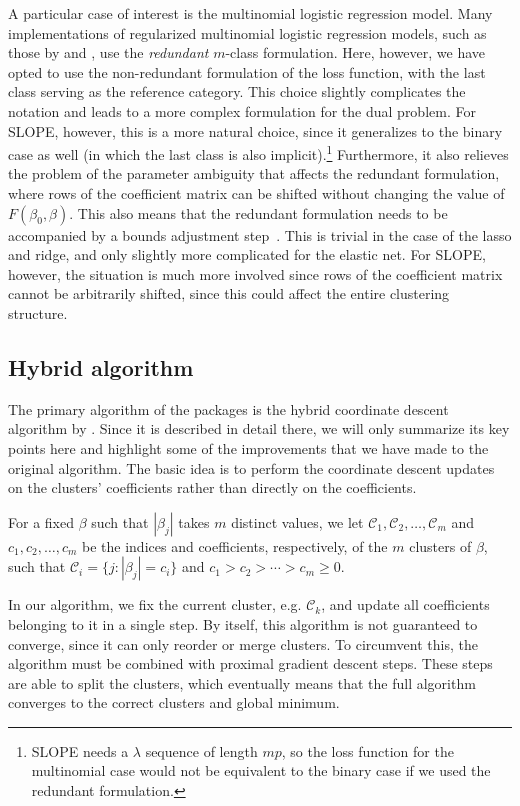 \documentclass[article]{jss}
\begin{document}
A particular case of interest is the multinomial logistic regression model.
Many implementations of regularized multinomial logistic regression models,
such as those by \citet{friedman2010} and \citet{fercoq2015}, use the
\emph{redundant} \(m\)-class formulation. Here, however, we have opted to use
the non-redundant formulation of the loss function, with the last class serving
as the reference category. This choice slightly complicates the notation and
leads to a more complex formulation for the dual problem. For SLOPE, however,
this is a more natural choice, since it generalizes to the binary case as well
(in which the last class is also implicit).\footnote{SLOPE needs a \(\lambda\)
  sequence of length \(mp\), so the loss function for the multinomial case
  would not be equivalent to the binary case if we used the redundant
  formulation.} Furthermore, it also relieves the problem of the parameter
ambiguity that affects the redundant formulation, where rows of the coefficient
matrix can be shifted without changing the value of \(F(\beta_0, \beta)\). This
also means that the redundant formulation needs to be accompanied by a bounds
adjustment step~\citep{friedman2010}. This is trivial in the case of the lasso
and ridge, and only slightly more complicated for the elastic net. For SLOPE,
however, the situation is much more involved since rows of the coefficient
matrix cannot be arbitrarily shifted, since this could affect the entire
clustering structure.

\subsection{Hybrid algorithm}

The primary algorithm of the  packages is the hybrid coordinate
descent algorithm by \citet{larsson2023}. Since it is described in detail
there, we will only summarize its key points here and highlight some of the
improvements that we have made to the original algorithm. The basic idea is to
perform the coordinate descent updates on the clusters' coefficients rather
than directly on the coefficients.

For a fixed $\beta$ such that $|\beta_j|$ takes $m$ distinct values, we let
\(\mathcal{C}_1, \mathcal{C}_2 , \dots, \mathcal{C}_m\) and
\(c_1, c_2, \dots,
c_m\) be the indices and coefficients, respectively, of the \(m\) clusters of
$\beta$, such that $\mathcal{C}_i = \{j : |\beta_j| = c_i\}$ and $c_1 > c_2 >
  \cdots > c_m \geq 0.$

In our algorithm, we fix the current cluster, e.g. $\mathcal{C}_k$, and
update all coefficients belonging to it in a single step. By itself, this
algorithm is not guaranteed to converge, since it can only reorder or merge
clusters. To circumvent this, the algorithm must be combined with proximal
gradient descent steps. These steps are able to split the clusters, which
eventually means that the full algorithm converges to the correct clusters and
global minimum.
\end{document}
